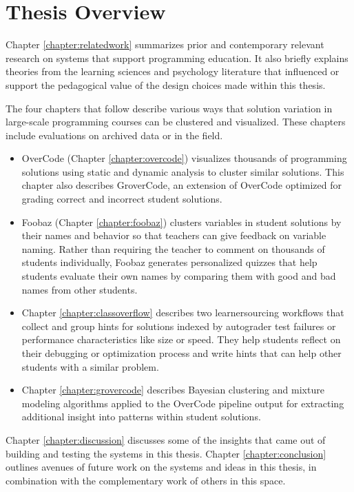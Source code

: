\section{Thesis Overview}

Chapter \ref{chapter:relatedwork} summarizes prior and contemporary relevant research on systems that support programming education. It also briefly explains theories from the learning sciences and psychology literature that influenced or support the pedagogical value of the design choices made within this thesis.

The four chapters that follow describe various ways that solution variation in large-scale programming courses can be clustered and visualized. These chapters include evaluations on archived data or in the field.

\begin{itemize}
\item OverCode (Chapter \ref{chapter:overcode}) visualizes thousands of programming solutions using static and dynamic analysis to cluster similar solutions. This chapter also describes GroverCode, an extension of OverCode optimized for grading correct and incorrect student solutions.

\item Foobaz (Chapter \ref{chapter:foobaz}) clusters variables in student solutions by their names and behavior so that teachers can give feedback on variable naming. Rather than requiring the teacher to comment on thousands of students individually, Foobaz generates personalized quizzes that help students evaluate their own names by comparing them with good and bad names from other students. 

\item Chapter \ref{chapter:classoverflow} describes two learnersourcing workflows that collect and group hints for solutions indexed by autograder test failures or performance characteristics like size or speed. They help students reflect on their debugging or optimization process and write hints that can help other students with a similar problem.%

\item Chapter \ref{chapter:grovercode} describes Bayesian clustering and mixture modeling algorithms applied to the OverCode pipeline output for extracting additional insight into patterns within student solutions. 
\end{itemize}

Chapter \ref{chapter:discussion} discusses some of the insights that came out of building and testing the systems in this thesis. Chapter \ref{chapter:conclusion} outlines avenues of future work on the systems and ideas in this thesis, in combination with the complementary work of others in this space.